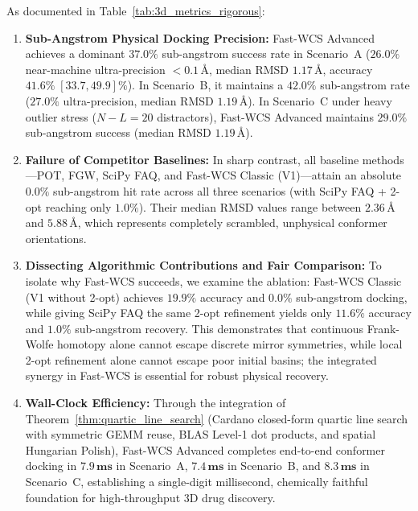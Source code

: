 \documentclass[conference]{IEEEtran}
\begin{document}
As documented in Table~\ref{tab:3d_metrics_rigorous}:
\begin{enumerate}
    \item \textbf{Sub-Angstrom Physical Docking Precision:} Fast-WCS Advanced achieves a dominant $\mathbf{37.0\%}$ sub-angstrom success rate in Scenario~A ($26.0\%$ near-machine ultra-precision $< 0.1\,\text{\AA}$, median RMSD $1.17\,\text{\AA}$, accuracy $41.6\% \; [33.7, 49.9]\%$). In Scenario~B, it maintains a $\mathbf{42.0\%}$ sub-angstrom rate ($27.0\%$ ultra-precision, median RMSD $1.19\,\text{\AA}$). In Scenario~C under heavy outlier stress ($N - L = 20$ distractors), Fast-WCS Advanced maintains $\mathbf{29.0\%}$ sub-angstrom success (median RMSD $1.19\,\text{\AA}$).
    \item \textbf{Failure of Competitor Baselines:} In sharp contrast, all baseline methods---POT, FGW, SciPy FAQ, and Fast-WCS Classic (V1)---attain an absolute $\mathbf{0.0\%}$ sub-angstrom hit rate across all three scenarios (with SciPy FAQ + 2-opt reaching only $1.0\%$). Their median RMSD values range between $2.36\,\text{\AA}$ and $5.88\,\text{\AA}$, which represents completely scrambled, unphysical conformer orientations.
    \item \textbf{Dissecting Algorithmic Contributions and Fair Comparison:} To isolate why Fast-WCS succeeds, we examine the ablation: Fast-WCS Classic (V1 without 2-opt) achieves $19.9\%$ accuracy and $0.0\%$ sub-angstrom docking, while giving SciPy FAQ the same 2-opt refinement yields only $11.6\%$ accuracy and $1.0\%$ sub-angstrom recovery. This demonstrates that continuous Frank-Wolfe homotopy alone cannot escape discrete mirror symmetries, while local 2-opt refinement alone cannot escape poor initial basins; the integrated synergy in Fast-WCS is essential for robust physical recovery.
    \item \textbf{Wall-Clock Efficiency:} Through the integration of Theorem~\ref{thm:quartic_line_search} (Cardano closed-form quartic line search with symmetric GEMM reuse, BLAS Level-1 dot products, and spatial Hungarian Polish), Fast-WCS Advanced completes end-to-end conformer docking in $\mathbf{7.9\,\text{ms}}$ in Scenario~A, $\mathbf{7.4\,\text{ms}}$ in Scenario~B, and $\mathbf{8.3\,\text{ms}}$ in Scenario~C, establishing a single-digit millisecond, chemically faithful foundation for high-throughput 3D drug discovery.
\end{enumerate}
\end{document}
